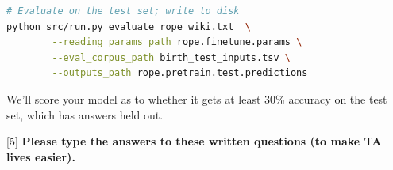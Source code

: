 \begin{parts}
\begin{subparts}
\begin{lstlisting}[language=bash]
# Evaluate on the test set; write to disk
python src/run.py evaluate rope wiki.txt  \
        --reading_params_path rope.finetune.params \
        --eval_corpus_path birth_test_inputs.tsv \
        --outputs_path rope.pretrain.test.predictions

\end{lstlisting}


We'll score your model as to whether it gets at least 30\% accuracy on the test set, which has answers held out.


\end{subparts}

\end{parts}

[5]
{\color{red} \textbf{Please type the answers to these written questions (to make TA lives easier).}}
